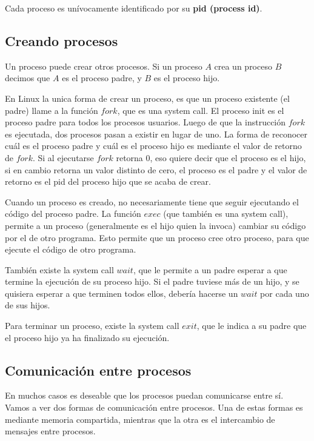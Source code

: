 \documentclass{article}
\begin{document}
Cada proceso es un\'ivocamente identificado por su \textbf{pid (process id)}.

\subsection{Creando procesos}

Un proceso puede crear otros procesos. Si un proceso $A$ crea un proceso $B$ decimos que $A$ es el proceso padre, y $B$ es el proceso hijo.

En Linux la unica forma de crear un proceso, es que un proceso existente (el padre) llame a la funci\'on $fork$, que es una system call. El proceso init es el proceso padre para todos los procesos usuarios. Luego de que la instrucci\'on $fork$ es ejecutada, dos procesos pasan a existir en lugar de uno. La forma de reconocer cu\'al es el proceso padre y cu\'al es el proceso hijo es mediante el valor de retorno de $fork$. Si al ejecutarse $fork$ retorna 0, eso quiere decir que el proceso es el hijo, si en cambio retorna un valor distinto de cero, el proceso es el padre y el valor de retorno es el pid del proceso hijo que se acaba de crear.

Cuando un proceso es creado, no necesariamente tiene que seguir ejecutando el c\'odigo del proceso padre. La funci\'on $exec$ (que tambi\'en es una system call), permite a un proceso (generalmente es el hijo quien la invoca) cambiar su c\'odigo por el de otro programa. Esto permite que un proceso cree otro proceso, para que ejecute el c\'odigo de otro programa.

Tambi\'en existe la system call $wait$, que le permite a un padre esperar a que termine la ejecuci\'on de su proceso hijo. Si el padre tuviese m\'as de un hijo, y se quisiera esperar a que terminen todos ellos, deber\'ia hacerse un $wait$ por cada uno de sus hijos.

Para terminar un proceso, existe la system call $exit$, que le indica a su padre que el proceso hijo ya ha finalizado su ejecuci\'on.

\subsection{Comunicaci\'on entre procesos}

En muchos casos es deseable que los procesos puedan comunicarse entre s\'i. Vamos a ver dos formas de comunicaci\'on entre procesos. Una de estas formas es mediante memoria compartida, mientras que la otra es el intercambio de mensajes entre procesos.
\end{document}
